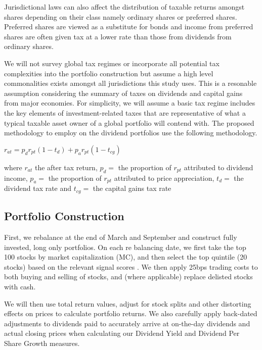 \documentclass[11pt,preprint, authoryear]{elsarticle}
\numberwithin{equation}{section}
\numberwithin{figure}{section}
\numberwithin{table}{section}
\begin{document}
Jurisdictional laws can also affect the distribution of taxable returns
amongst shares depending on their class namely ordinary shares or
preferred shares. Preferred shares are viewed as a substitute for bonds
and income from preferred shares are often given tax at a lower rate
than those from dividends from ordinary shares.

We will not survey global tax regimes or incorporate all potential tax
complexities into the portfolio construction but assume a high level
commonalities exists amongst all jurisdictions this study uses. This is
a resonable assumption considering the summary of taxes on dividends and
capital gains from major economies. For simplicity, we will assume a
basic tax regime includes the key elements of investment-related taxes
that are representative of what a typical taxable asset owner of a
global portfolio will contend with. The proposed methodology to employ
on the dividend portfolios use the following methodology.

\(r_{a t}=p_d r_{p t}\left(1-t_d\right)+p_a r_{p t}\left(1-t_{c g}\right)\)

where \(r_{a t}\) the after tax return, \(p_d=\) the proportion of
\(r_{p t}\) attributed to dividend income, \(p_a=\) the proportion of
\(r_{p t}\) attributed to price appreciation, \(t_d=\) the dividend tax
rate and \(t_{c g}=\) the capital gains tax rate

\newpage

\hypertarget{portfolio-construction}{%
\subsection{Portfolio Construction}\label{portfolio-construction}}

First, we rebalance at the end of March and September and construct
fully invested, long only portfolios. On each re balancing date, we
first take the top 100 stocks by market capitalization (MC), and then
select the top quintile (20 stocks) based on the relevant signal scores
. We then apply 25bps trading costs to both buying and selling of
stocks, and (where applicable) replace delisted stocks with cash.

We will then use total return values, adjust for stock splits and other
distorting effects on prices to calculate portfolio returns. We also
carefully apply back-dated adjustments to dividends paid to accurately
arrive at on-the-day dividends and actual closing prices when
calculating our Dividend Yield and Dividend Per Share Growth measures.
\end{document}
